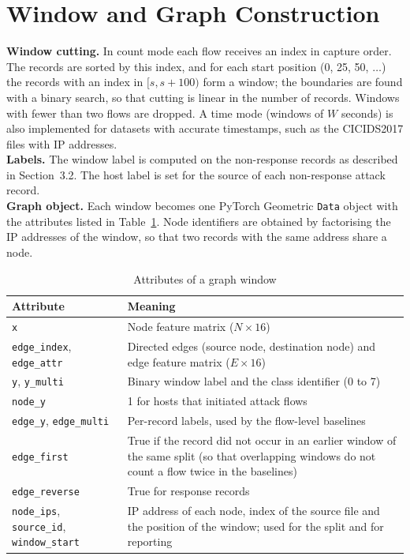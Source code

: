 \section{Window and Graph Construction}
\textbf{Window cutting.} In count mode each flow receives an index in capture order. The records are sorted by this index, and for each start position (0, 25, 50, $\dots$) the records with an index in $[s,s+100)$ form a window; the boundaries are found with a binary search, so that cutting is linear in the number of records. Windows with fewer than two flows are dropped. A time mode (windows of $W$ seconds) is also implemented for datasets with accurate timestamps, such as the CICIDS2017 files with IP addresses.\\

\textbf{Labels.} The window label is computed on the non-response records as described in Section~3.2. The host label is set for the source of each non-response attack record.\\

\textbf{Graph object.} Each window becomes one PyTorch Geometric \texttt{Data} object with the attributes listed in Table~\ref{tab:dataattrs}. Node identifiers are obtained by factorising the IP addresses of the window, so that two records with the same address share a node.

\begin{table}[htbp]
\centering
\caption{Attributes of a graph window}
\label{tab:dataattrs}
\small
\begin{tabularx}{\textwidth}{|p{3.2cm}|X|}
\hline
\textbf{Attribute} & \textbf{Meaning} \\ \hline
\texttt{x} & Node feature matrix ($N\times16$) \\ \hline
\texttt{edge\_index}, \texttt{edge\_attr} & Directed edges (source node, destination node) and edge feature matrix ($E\times16$) \\ \hline
\texttt{y}, \texttt{y\_multi} & Binary window label and the class identifier (0 to 7) \\ \hline
\texttt{node\_y} & 1 for hosts that initiated attack flows \\ \hline
\texttt{edge\_y}, \texttt{edge\_multi} & Per-record labels, used by the flow-level baselines \\ \hline
\texttt{edge\_first} & True if the record did not occur in an earlier window of the same split (so that overlapping windows do not count a flow twice in the baselines) \\ \hline
\texttt{edge\_reverse} & True for response records \\ \hline
\texttt{node\_ips}, \texttt{source\_id}, \texttt{window\_start} & IP address of each node, index of the source file and the position of the window; used for the split and for reporting \\ \hline
\end{tabularx}
\end{table}

